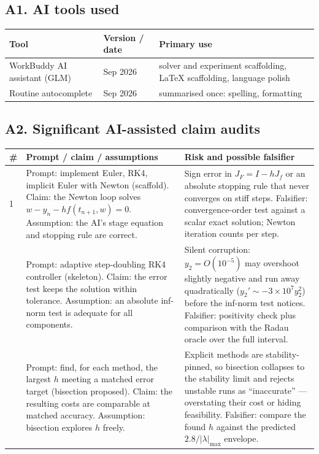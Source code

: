 ﻿\documentclass[11pt,a4paper]{article}
\begin{document}
\subsection*{A1. AI tools used}
\begin{center}
\begin{tabular}{@{}p{4.2cm}p{3.4cm}p{6.4cm}@{}}
\toprule
Tool & Version / date & Primary use \\
\midrule
WorkBuddy AI assistant (GLM) & Sep 2026 &
solver and experiment scaffolding, \LaTeX{} scaffolding, language polish \\
Routine autocomplete & Sep 2026 & summarised once: spelling, formatting \\
\bottomrule
\end{tabular}
\end{center}

\subsection*{A2. Significant AI-assisted claim audits}
\begin{center}
\begin{tabular}{@{}p{0.4cm}p{7.2cm}p{6.4cm}@{}}
\toprule
\# & Prompt / claim / assumptions & Risk and possible falsifier \\
\midrule
1 &
Prompt: implement Euler, RK4, implicit Euler with Newton (scaffold).
Claim: the Newton loop solves $w-y_n-hf(t_{n+1},w)=0$.
Assumption: the AI's stage equation and stopping rule are correct. &
Sign error in $J_F=I-hJ_f$ or an absolute stopping rule that never
converges on stiff steps.  Falsifier: convergence-order test against a
scalar exact solution; Newton iteration counts per step. \\
\addlinespace
2 &
Prompt: adaptive step-doubling RK4 controller (skeleton).
Claim: the error test keeps the solution within tolerance.
Assumption: an absolute inf-norm test is adequate for all components. &
Silent corruption: $y_2=O(10^{-5})$ may overshoot slightly negative and
run away quadratically ($y_2'\sim-3\times10^{7}y_2^{2}$) before the
inf-norm test notices.  Falsifier: positivity check plus comparison with
the Radau oracle over the full interval. \\
\addlinespace
3 &
Prompt: find, for each method, the largest $h$ meeting a matched error
target (bisection proposed).
Claim: the resulting costs are comparable at matched accuracy.
Assumption: bisection explores $h$ freely. &
Explicit methods are stability-pinned, so bisection collapses to the
stability limit and rejects unstable runs as ``inaccurate'' ---
overstating their cost or hiding feasibility.  Falsifier: compare the
found $h$ against the predicted $2.8/|\lambda|_{\max}$ envelope. \\
\bottomrule
\end{tabular}
\end{center}
\end{document}
